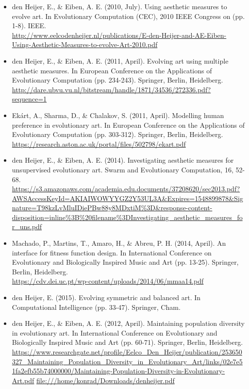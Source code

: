 \documentclass[10pt,a4paper]{article}
\begin{document}
\begin{itemize}
	\item den Heijer, E., \& Eiben, A. E. (2010, July). Using aesthetic measures to evolve art. In Evolutionary Computation (CEC), 2010 IEEE Congress on (pp. 1-8). IEEE.
	\\
	\url{http://www.eelcodenheijer.nl/publications/E-den-Heijer-and-AE-Eiben-Using-Aesthetic-Measures-to-evolve-Art-2010.pdf}
	
	\item den Heijer, E., \& Eiben, A. E. (2011, April). Evolving art using multiple aesthetic measures. In European Conference on the Applications of Evolutionary Computation (pp. 234-243). Springer, Berlin, Heidelberg.
	\\
	\url{http://dare.ubvu.vu.nl/bitstream/handle/1871/34536/272336.pdf?sequence=1}
	
	\item Ekárt, A., Sharma, D., \& Chalakov, S. (2011, April). Modelling human preference in evolutionary art. In European Conference on the Applications of Evolutionary Computation (pp. 303-312). Springer, Berlin, Heidelberg.
	\\
	\url{https://research.aston.ac.uk/portal/files/502798/ekart.pdf}
	
	\item den Heijer, E., \& Eiben, A. E. (2014). Investigating aesthetic measures for unsupervised evolutionary art. Swarm and Evolutionary Computation, 16, 52-68.
	\\
	\url{https://s3.amazonaws.com/academia.edu.documents/37208620/sec2013.pdf?AWSAccessKeyId=AKIAIWOWYYGZ2Y53UL3A&Expires=1548899878&Signature=T98kzLvMluIDiePBw88y8MDxtiM%3D&response-content-disposition=inline%3B%20filename%3DInvestigating_aesthetic_measures_for_uns.pdf}
	
	\item Machado, P., Martins, T., Amaro, H., \& Abreu, P. H. (2014, April). An interface for fitness function design. In International Conference on Evolutionary and Biologically Inspired Music and Art (pp. 13-25). Springer, Berlin, Heidelberg.
	\\
	\url{https://cdv.dei.uc.pt/wp-content/uploads/2014/06/mmaa14.pdf}
	
	\item den Heijer, E. (2015). Evolving symmetric and balanced art. In Computational Intelligence (pp. 33-47). Springer, Cham.
	
	\item den Heijer, E., \& Eiben, A. E. (2012, April). Maintaining population diversity in evolutionary art. In International Conference on Evolutionary and Biologically Inspired Music and Art (pp. 60-71). Springer, Berlin, Heidelberg.
	\\
	\url{https://www.researchgate.net/profile/Eelco_Den_Heijer/publication/253650327_Maintaining_Population_Diversity_in_Evolutionary_Art/links/02e7e51fa2efb55b74000000/Maintaining-Population-Diversity-in-Evolutionary-Art.pdf}
	\url{file:///home/konrad/Downloads/denheijer.pdf}
	

\end{itemize}
\end{document}
